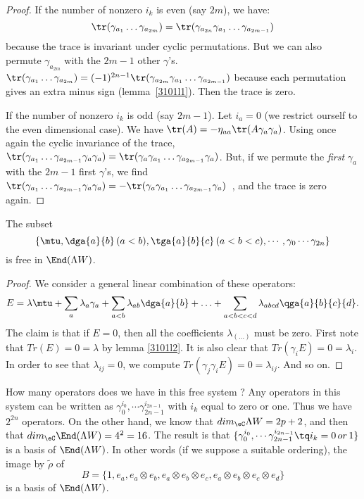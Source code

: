 \begin{proof}
 If the number of nonzero $i_k$ is even (say $2m$), we have:
\[
	\tr(\gamma_{a_1}\ldots\gamma_{a_{2m}})=\tr(\gamma_{a_{2n}}\gamma_{a_1}\ldots\gamma_{a_{2m-1}})
\] 
because the trace is invariant under cyclic permutations. But we can also permute $\gamma_{a_{2m}}$ with the $2m-1$ other $\gamma$'s.  $\tr(\gamma_{a_1}\ldots\gamma_{a_{2m}})=(-1)^{2n-1}\tr(\gamma_{a_{2m}}\gamma_{a_1}\ldots\gamma_{a_{2m-1}})$ because each permutation gives an extra minus sign (\hbox{lemma \ref{3101l1}}). Then the trace is zero.

If the number of nonzero $i_k$ is odd (say $2m-1$). Let $i_a=0$ (we restrict ourself to the even dimensional case). We have $\tr(A)=-\eta_{aa}\tr(A\gamma_a\gamma_a)$. Using once again the cyclic invariance of the trace, $\tr(\gamma_{a_1}\ldots\gamma_{a_{2m-1}}\gamma_a\gamma_a)=\tr(\gamma_a\gamma_{a_1}\ldots\gamma_{a_{2m-1}}\gamma_a)$. But, if we permute the \emph{first} $\gamma_a$ with the $2m-1$ first $\gamma$'s, we find \hbox{$\tr(\gamma_{a_1}\ldots\gamma_{a_{2m-1}}\gamma_a\gamma_a)=-\tr(\gamma_a\gamma_{a_1}\ldots\gamma_{a_{2m-1}}\gamma_a)$ }, and the trace is zero again.
\end{proof}

\begin{proposition}
The subset
\[
	\left\{\mtu,\dga{a}{b}\,(a<b),\tga{a}{b}{c}\,(a<b<c), \cdots, \gamma_{0}\cdots\gamma_{2n} \right\}
\]
 is free in $\End(\Lambda W)$.
\end{proposition}

\begin{proof}
We consider a general linear combination of these operators:
\[
 E=\lambda\mtu+\sum_a\lambda_a\gamma_a+\sum_{a<b}\lambda_{ab}\dga{a}{b}+\ldots+
 \sum_{a<b<c<d}\lambda_{abcd}\qga{a}{b}{c}{d}.
\]
The claim is that if $E=0$, then all the coefficients $\lambda_{(\ldots)}$ must be zero. First note that $Tr(E)=0=\lambda$ by lemma \ref{3101l2}. It is also clear that $Tr(\gamma_iE)=0=\lambda_i$. In order to see that $\lambda_{ij}=0$, we compute $Tr(\gamma_j\gamma_iE)=0=\lambda_{ij}$. And so on.
\end{proof}

How many operators does we have in this free system ? Any operators in this system can be written as $\gamma_{0}^{i_{0}},\cdots\gamma^{i_{2n-1}}_{2n-1}$ with $i_k$ equal to zero or one. Thus we have $2^{2n}$ operators. On the other hand, we know that $dim_{\eC}\Lambda W=2p+2$, and then that $dim_{\eC}\End(\Lambda W)=4^2=16$. The result is that $\{ \gamma_{0}^{i_{0}},\cdots\gamma^{i_{2n-1}}_{2n-1}  \tq i_k=0\,or\,1\}$ is a basis of $\End(\Lambda W)$. In other words (if we suppose a suitable ordering), the image by $\tilde\rho$ of 
\[ 
B=\{1,e_a,e_a\otimes e_b,e_a\otimes e_b\otimes e_c,e_a\otimes e_b\otimes e_c\otimes e_d\}
\]
 is a basis of $\End(\Lambda W)$.

